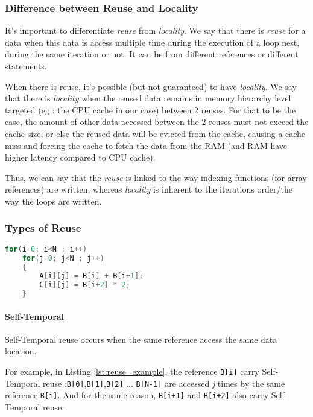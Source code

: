 \documentclass[paper=a4, fontsize=11.5pt]{scrartcl}
\numberwithin{equation}{section}        %
\numberwithin{figure}{section}          %
\numberwithin{table}{section}               %
\begin{document}
        \subsubsection{Difference between Reuse and Locality}
            It's important to differentiate \textit{reuse} from \textit{locality}.
            We say that there is \textit{reuse} for a data when this data is
            access multiple time during the execution of a loop nest, during
            the same iteration or not. It can be from different references or different statements.
            
            When there is reuse, it's possible (but not guaranteed) to have
            \textit{locality}. We say that there is \textit{locality} when the
            reused data remains in memory hierarchy level targeted 
            (eg : the CPU cache in our case) between 2 reuses.
            For that to be the case, the amount of other data accessed between the
            2 reuses must not exceed the cache size, or else the reused data will be
            evicted from the cache, causing a cache miss and forcing the cache
            to fetch the data from the RAM (and RAM have higher latency compared to CPU cache).


            Thus, we can say that the \textit{reuse} is linked to the way indexing
            functions (for array references) are written, whereas \textit{locality} is
            inherent to the iterations order/the way the loops are written.

        \subsubsection{Types of Reuse}
            
\begin{lstlisting}[frame=single, language=C, caption=Reuse example, label={lst:reuse_example}]
for(i=0; i<N ; i++)
    for(j=0; j<N ; j++)
    {
        A[i][j] = B[i] + B[i+1];
        C[i][j] = B[i+2] * 2;
    }
\end{lstlisting}

            \paragraph{Self-Temporal}
                Self-Temporal reuse occurs when the same reference access the same
                data location.
                
                For example, in Listing \ref{lst:reuse_example}, the reference \verb'B[i]' carry Self-Temporal
                reuse :\verb'B[0]',\verb'B[1]',\verb'B[2]' ... \verb'B[N-1]' are accessed
                \textit{j} times by the same reference \verb'B[i]'.
                And for the same reason, \verb'B[i+1]' and \verb'B[i+2]' also carry Self-Temporal reuse.
\end{document}

